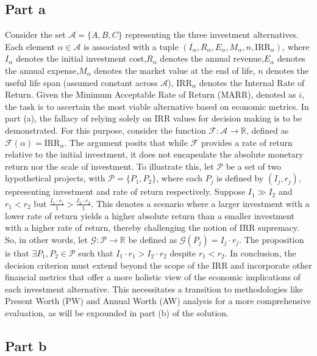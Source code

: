 \documentclass[12pt]{article}
\begin{document}
\subsection*{Part a}
Consider the set \(\mathcal{A} = \{A, B, C\}\) representing the three investment alternatives. Each element \( \alpha \in \mathcal{A} \) is associated with a tuple \((I_\alpha, R_\alpha, E_\alpha, M_\alpha, n, \text{IRR}_\alpha)\), where \( I_\alpha \) denotes the initial investment cost,\( R_\alpha \) denotes the annual revenue,\( E_\alpha \) denotes the annual expense,\( M_\alpha \) denotes the market value at the end of life, \( n \) denotes the useful life span (assumed constant across \(\mathcal{A}\)), \( \text{IRR}_\alpha \) denotes the Internal Rate of Return. Given the Minimum Acceptable Rate of Return (MARR), denoted as \( i \), the task is to ascertain the most viable alternative based on economic metrics. In part (a), the fallacy of relying solely on IRR values for decision making is to be demonstrated. For this purpose, consider the function \( \mathcal{F}: \mathcal{A} \to \mathbb{R} \), defined as \(\mathcal{F}(\alpha) = \text{IRR}_\alpha\). The argument posits that while \(\mathcal{F}\) provides a rate of return relative to the initial investment, it does not encapsulate the absolute monetary return nor the scale of investment. To illustrate this, let \( \mathcal{P} \) be a set of two hypothetical projects, with \(\mathcal{P} = \{P_1, P_2\}\), where each \(P_j\) is defined by \((I_j, r_j)\), representing investment and rate of return respectively. Suppose \(I_1 \gg I_2\) and \(r_1 < r_2\) but \(\frac{I_1 \cdot r_1}{1} > \frac{I_2 \cdot r_2}{1}\). This denotes a scenario where a larger investment with a lower rate of return yields a higher absolute return than a smaller investment with a higher rate of return, thereby challenging the notion of IRR supremacy. So, in other words, let \(\mathcal{G}: \mathcal{P} \to \mathbb{R}\) be defined as \(\mathcal{G}(P_j) = I_j \cdot r_j\). The proposition is that \(\exists P_1, P_2 \in \mathcal{P}\) such that \(I_1 \cdot r_1 > I_2 \cdot r_2\) despite \(r_1 < r_2\). In conclusion, the decision criterion must extend beyond the scope of the IRR and incorporate other financial metrics that offer a more holistic view of the economic implications of each investment alternative. This necessitates a transition to methodologies like Present Worth (PW) and Annual Worth (AW) analysis for a more comprehensive evaluation, as will be expounded in part (b) of the solution.
\subsection*{Part b}
\end{document}
